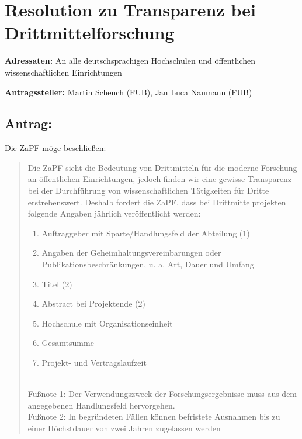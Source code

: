 \documentclass[10pt,oneside]{scrartcl}
\begin{document}
\section*{Resolution zu Transparenz bei Drittmittelforschung}

\textbf{Adressaten:} An alle deutschsprachigen Hochschulen und öffentlichen wissenschaftlichen Einrichtungen

\textbf{Antragssteller:} Martin Scheuch (FUB), Jan Luca Naumann (FUB)

\subsection*{Antrag:}
Die ZaPF möge beschließen:
\begin{quote}
Die ZaPF sieht die Bedeutung von Drittmitteln für die moderne Forschung an öffentlichen Einrichtungen, jedoch finden wir eine gewisse Transparenz bei der Durchführung von wissenschaftlichen Tätigkeiten für Dritte erstrebenswert. Deshalb fordert die ZaPF, dass bei Drittmittelprojekten folgende Angaben jährlich veröffentlicht werden:
\begin{enumerate}
\item Auftraggeber mit Sparte/Handlungsfeld der Abteilung (1)
\item Angaben der Geheimhaltungsvereinbarungen oder Publikationsbeschränkungen, u. a. Art, Dauer und Umfang
\item Titel (2)
\item Abstract bei Projektende (2)
\item Hochschule mit Organisationseinheit
\item Gesamtsumme
\item Projekt- und Vertragslaufzeit 
\end{enumerate}
~\\
Fußnote 1: Der Verwendungszweck der Forschungsergebnisse muss aus dem angegebenen Handlungsfeld hervorgehen.\\

Fußnote 2: In begründeten Fällen können befristete Ausnahmen bis zu einer Höchstdauer von zwei Jahren zugelassen werden\\


\end{quote}
\end{document}
